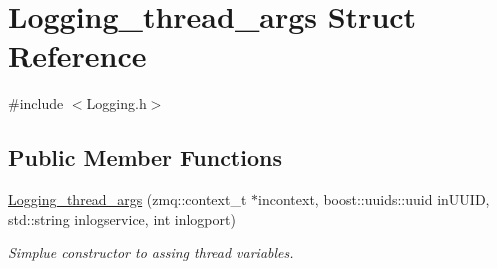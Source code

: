 \hypertarget{structLogging__thread__args}{\section{Logging\-\_\-thread\-\_\-args Struct Reference}
\label{structLogging__thread__args}
}


{\ttfamily \#include $<$Logging.\-h$>$}

\subsection*{Public Member Functions}
\begin{DoxyCompactItemize}
\item 
\hypertarget{structLogging__thread__args_a9496cec11539e17b104d3cbdf3174fdb}{\hyperlink{structLogging__thread__args_a9496cec11539e17b104d3cbdf3174fdb}{Logging\-\_\-thread\-\_\-args} (zmq\-::context\-\_\-t $\ast$incontext, boost\-::uuids\-::uuid in\-U\-U\-I\-D, std\-::string inlogservice, int inlogport)}\label{structLogging__thread__args_a9496cec11539e17b104d3cbdf3174fdb}

\begin{DoxyCompactList}\small\item\em Simplue constructor to assing thread variables. \end{DoxyCompactList}\end{DoxyCompactItemize}
